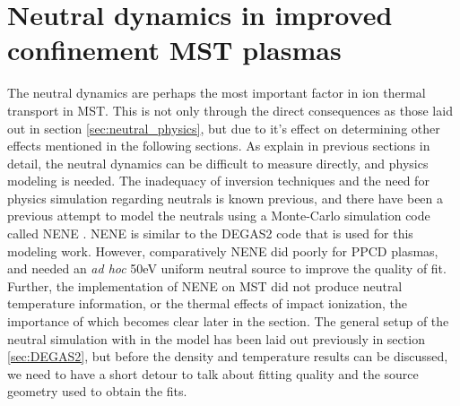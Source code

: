 

\section{Neutral dynamics in improved confinement MST plasmas}\label{sec:neutral_results}

The neutral dynamics are perhaps the most important factor in ion thermal transport in MST. This is not only through the direct consequences as those laid out in section \ref{sec:neutral_physics}, but due to it's effect on determining other effects mentioned in the following sections. As explain in previous sections in detail, the neutral dynamics can be difficult to measure directly, and physics modeling is needed. The inadequacy of inversion techniques and the need for physics simulation regarding neutrals is known previous\cite{Eilerman2012}, and there have been a previous attempt to model the neutrals using a Monte-Carlo simulation code called NENE \cite{NENE}. NENE is similar to the DEGAS2 code that is used for this modeling work. However, comparatively NENE did poorly for PPCD plasmas, and needed an \textit{ad hoc} 50eV uniform neutral source to improve the quality of fit\cite{Eilerman}. Further, the implementation of NENE on MST did not produce neutral temperature information, or the thermal effects of impact ionization, the importance of which becomes clear later in the section. The general setup of the neutral simulation with in the model has been laid out previously in section \ref{sec:DEGAS2}, but before the density and temperature results can be discussed, we need to have a short detour to talk about fitting quality and the source geometry used to obtain the fits.

